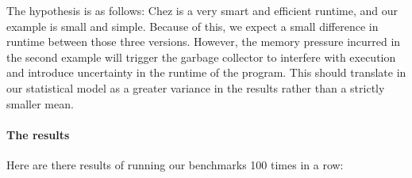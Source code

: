 \documentclass[
]{article}
\begin{document}
The hypothesis is as follows: Chez is a very smart and efficient
runtime, and our example is small and simple. Because of this, we expect
a small difference in runtime between those three versions. However, the
memory pressure incurred in the second example will trigger the garbage
collector to interfere with execution and introduce uncertainty in the
runtime of the program. This should translate in our statistical model
as a greater variance in the results rather than a strictly smaller
mean.

\hypertarget{the-results}{%
\paragraph{The results}\label{the-results}}

Here are there results of running our benchmarks 100 times in a row:
\end{document}
